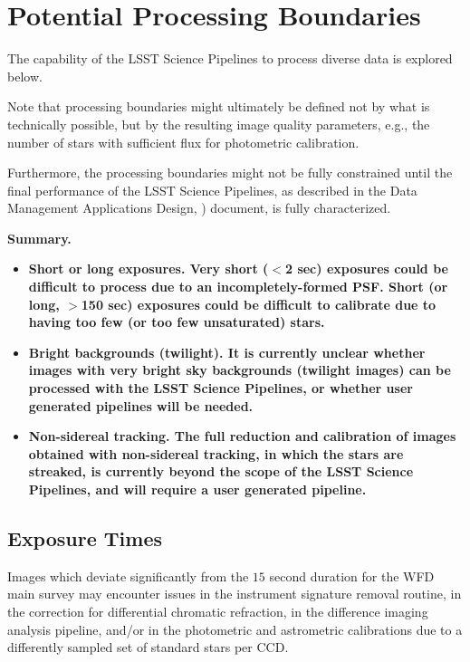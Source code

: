 \section{Potential Processing Boundaries}\label{sec:procbounds}

The capability of the LSST Science Pipelines to process diverse data is explored below.

Note that processing boundaries might ultimately be defined not by what is technically 
possible, but by the resulting image quality parameters, e.g., the number of stars with 
sufficient flux for photometric calibration.

Furthermore, the processing boundaries might not be fully constrained until the final 
performance of the LSST Science Pipelines, as described in the Data Management 
Applications Design, ) document, is fully characterized.

{\bf Summary.}\\

\begin{itemize}
\item \bf{Short or long exposures.} Very short ($<$2 sec) exposures could be difficult to 
process due to an incompletely-formed PSF. Short (or long, $>$150 sec) exposures 
could be difficult to calibrate due to having too few (or too few unsaturated) stars.
\item \bf{Bright backgrounds (twilight).} It is currently unclear whether images with very 
bright sky backgrounds (twilight images) can be processed with the LSST Science Pipelines, 
or whether user generated pipelines will be needed.
\item \bf{Non-sidereal tracking.} The full reduction and calibration of images obtained 
with non-sidereal tracking, in which the stars are streaked, is currently beyond the scope 
of the LSST Science Pipelines, and will require a user generated pipeline.
\end{itemize}


\subsection{Exposure Times}\label{ssec:procbounds_expt}

Images which deviate significantly from the $15$ second duration for the WFD main survey 
may encounter issues in the instrument signature removal routine, in the correction for 
differential chromatic refraction, in the difference imaging analysis pipeline, and/or in 
the photometric and astrometric calibrations due to a differently sampled set of standard 
stars per CCD.

